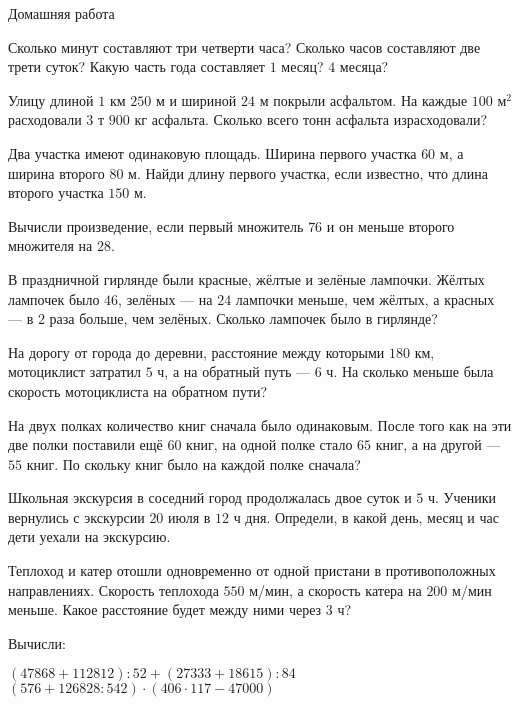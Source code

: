 \begin{homework}[number=3]
	\begin{listofex}
		\item Домашняя работа
	\end{listofex}
\end{homework}

\begin{class}[number=4]
	\begin{listofex}
		\item Сколько минут составляют три четверти часа? Сколько часов составляют две трети суток? Какую часть года составляет \( 1 \) месяц? \( 4 \) месяца?
		\item Улицу длиной \( 1 \) км \( 250 \) м и шириной \( 24 \) м покрыли асфальтом. На каждые \( 100 \) м\( ^2 \) расходовали \( 3 \) т \( 900 \) кг асфальта. Сколько всего тонн асфальта израсходовали?
		\item Два участка имеют одинаковую площадь. Ширина первого участка \( 60 \) м, а ширина второго \( 80 \) м. Найди длину первого участка, если известно, что длина второго участка \( 150 \) м. 
		\item Вычисли произведение, если первый множитель \( 76 \) и он меньше второго множителя на \( 28 \).
		\item В праздничной гирлянде были красные, жёлтые и зелёные лампочки. Жёлтых лампочек было \( 46 \), зелёных --- на \( 24 \) лампочки меньше, чем жёлтых, а красных --- в \( 2 \) раза больше, чем зелёных. Сколько лампочек было в гирлянде?
		\item На дорогу от города до деревни, расстояние между которыми \( 180 \) км, мотоциклист затратил \( 5 \) ч, а на обратный путь --- \( 6 \) ч. На сколько меньше была скорость мотоциклиста на обратном пути?
		\item На двух полках количество книг сначала было одинаковым. После того как на эти две полки поставили ещё \( 60 \) книг, на одной полке стало \( 65 \) книг, а на другой --- \( 55 \) книг. По скольку книг было на каждой полке сначала?
		\item Школьная экскурсия в соседний город продолжалась двое суток и \( 5 \) ч. Ученики вернулись с экскурсии \( 20 \) июля в \( 12 \) ч дня. Определи, в какой день, месяц и час дети уехали на экскурсию.
		\item Теплоход и катер отошли одновременно от одной пристани в противоположных направлениях. Скорость теплохода \( 550 \) м/мин, а скорость катера на \( 200 \) м/мин меньше. Какое расстояние будет между ними через \( 3 \) ч?
		\item Вычисли:
		\begin{tasks}
			\task \( (47868+112812):52+(27333+18615):84 \)
			\task \( (576+126828:542)\cdot(406\cdot117-47000) \)
		\end{tasks}
		\end{listofex}
\end{class}
